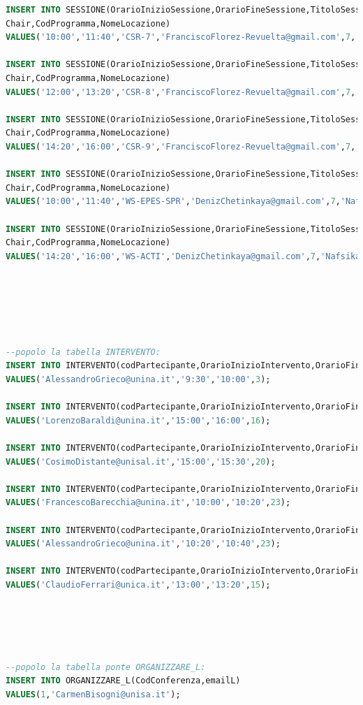 \documentclass[a4page]{article}
\begin{document}
\begin{lstlisting}[language=SQL,
        deletekeywords={IDENTITY,INT},
        morekeywords={clustered},    
        framesep=10pt,
        framextopmargin=10pt]
INSERT INTO SESSIONE(OrarioInizioSessione,OrarioFineSessione,TitoloSessione,
Chair,CodProgramma,NomeLocazione)
VALUES('10:00','11:40','CSR-7','FranciscoFlorez-Revuelta@gmail.com',7,'Athena');

INSERT INTO SESSIONE(OrarioInizioSessione,OrarioFineSessione,TitoloSessione,
Chair,CodProgramma,NomeLocazione)
VALUES('12:00','13:20','CSR-8','FranciscoFlorez-Revuelta@gmail.com',7,'Athena');

INSERT INTO SESSIONE(OrarioInizioSessione,OrarioFineSessione,TitoloSessione,
Chair,CodProgramma,NomeLocazione)
VALUES('14:20','16:00','CSR-9','FranciscoFlorez-Revuelta@gmail.com',7,'Athena');

INSERT INTO SESSIONE(OrarioInizioSessione,OrarioFineSessione,TitoloSessione,
Chair,CodProgramma,NomeLocazione)
VALUES('10:00','11:40','WS-EPES-SPR','DenizChetinkaya@gmail.com',7,'Nafsika');

INSERT INTO SESSIONE(OrarioInizioSessione,OrarioFineSessione,TitoloSessione,
Chair,CodProgramma,NomeLocazione)
VALUES('14:20','16:00','WS-ACTI','DenizChetinkaya@gmail.com',7,'Nafsika');






--popolo la tabella INTERVENTO:
INSERT INTO INTERVENTO(codPartecipante,OrarioInizioIntervento,OrarioFineIntervento,CodSessione)
VALUES('AlessandroGrieco@unina.it','9:30','10:00',3);

INSERT INTO INTERVENTO(codPartecipante,OrarioInizioIntervento,OrarioFineIntervento,CodSessione)
VALUES('LorenzoBaraldi@unina.it','15:00','16:00',16);

INSERT INTO INTERVENTO(codPartecipante,OrarioInizioIntervento,OrarioFineIntervento,CodSessione)
VALUES('CosimoDistante@unisal.it','15:00','15:30',20);

INSERT INTO INTERVENTO(codPartecipante,OrarioInizioIntervento,OrarioFineIntervento,CodSessione)
VALUES('FrancescoBarecchia@unina.it','10:00','10:20',23);

INSERT INTO INTERVENTO(codPartecipante,OrarioInizioIntervento,OrarioFineIntervento,CodSessione)
VALUES('AlessandroGrieco@unina.it','10:20','10:40',23);

INSERT INTO INTERVENTO(codPartecipante,OrarioInizioIntervento,OrarioFineIntervento,CodSessione)
VALUES('ClaudioFerrari@unica.it','13:00','13:20',15);





--popolo la tabella ponte ORGANIZZARE_L:
INSERT INTO ORGANIZZARE_L(CodConferenza,emailL)
VALUES(1,'CarmenBisogni@unisa.it');


\end{lstlisting}
\end{document}

